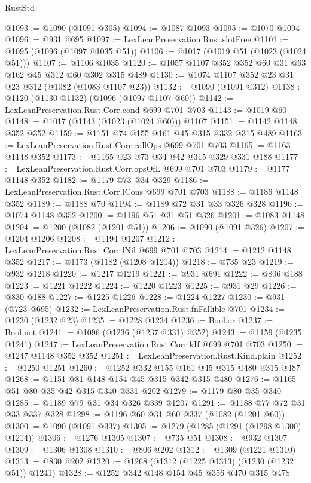 \begin{lexlean}{RustStd}
\begin{coremodule}
{\begin{coremodule}
{{{{{{{{{{@1093 := @1090 (@1091 @305)
@1094 := @1087 @1093
@1095 := @1070 @1094
@1096 := @931 @695
@1097 := LexLeanPreservation.Rust.slotFree
@1101 := @1095 (@1096 (@1097 @1035 @51))
@1106 := @1017 (@1019 @51 (@1023 (@1024 @51)))
@1107 := @1106 @1035
@1120 := @1057 @1107 @352 @352 @60 @31 @63 @162 @45 @312 @60 @302 @315 @489
@1130 := @1074 @1107 @352 @23 @31 @23 @312 (@1082 (@1083 @1107 @23))
@1132 := @1090 (@1091 @312)
@1138 := @1120 (@1130 @1132) (@1096 (@1097 @1107 @60))
@1142 := LexLeanPreservation.Rust.Corr.cond @699 @701 @703
@1143 := @1019 @60
@1148 := @1017 (@1143 (@1023 (@1024 @60))) @1107
@1151 := @1142 @1148 @352 @352
@1159 := @1151 @74 @155 @161 @45 @315 @332 @315 @489
@1163 := LexLeanPreservation.Rust.Corr.callOps @699 @701 @703
@1165 := @1163 @1148 @352
@1173 := @1165 @23 @73 @34 @42 @315 @329 @331 @188
@1177 := LexLeanPreservation.Rust.Corr.opsOfL @699 @701 @703
@1179 := @1177 @1148 @352
@1182 := @1179 @73 @34 @329
@1186 := LexLeanPreservation.Rust.Corr.lCons @699 @701 @703
@1188 := @1186 @1148 @352
@1189 := @1188 @70
@1194 := @1189 @72 @31 @33 @326 @328
@1196 := @1074 @1148 @352
@1200 := @1196 @51 @31 @51 @326
@1201 := @1083 @1148
@1204 := @1200 (@1082 (@1201 @51))
@1206 := @1090 (@1091 @326)
@1207 := @1204 @1206
@1208 := @1194 @1207
@1212 := LexLeanPreservation.Rust.Corr.lNil @699 @701 @703
@1214 := @1212 @1148 @352
@1217 := @1173 (@1182 (@1208 @1214))
@1218 := @735 @23
@1219 := @932 @1218
@1220 := @1217 @1219
@1221 := @931 @691
@1222 := @806 @188
@1223 := @1221 @1222
@1224 := @1220 @1223
@1225 := @931 @29
@1226 := @830 @188
@1227 := @1225 @1226
@1228 := @1224 @1227
@1230 := @931 (@723 @695)
@1232 := LexLeanPreservation.Rust.fnFallible @701
@1234 := @1230 (@1232 @23)
@1235 := @1228 @1234
@1236 := Bool.or
@1237 := Bool.not
@1241 := @1096 (@1236 (@1237 @331) @352)
@1243 := @1159 (@1235 @1241)
@1247 := LexLeanPreservation.Rust.Corr.kIf @699 @701 @703
@1250 := @1247 @1148 @352 @352
@1251 := LexLeanPreservation.Rust.Kind.plain
@1252 := @1250 @1251
@1260 := @1252 @332 @155 @161 @45 @315 @480 @315 @487
@1268 := @1151 @81 @148 @154 @45 @315 @342 @315 @480
@1276 := @1165 @51 @80 @35 @42 @315 @340 @331 @202
@1279 := @1179 @80 @35 @340
@1285 := @1189 @79 @31 @34 @326 @339 @1207
@1291 := @1188 @77 @72 @31 @33 @337 @328
@1298 := @1196 @60 @31 @60 @337 (@1082 (@1201 @60))
@1300 := @1090 (@1091 @337)
@1305 := @1279 (@1285 (@1291 (@1298 @1300) @1214))
@1306 := @1276 @1305
@1307 := @735 @51
@1308 := @932 @1307
@1309 := @1306 @1308
@1310 := @806 @202
@1312 := @1309 (@1221 @1310)
@1313 := @830 @202
@1320 := @1268 (@1312 (@1225 @1313) (@1230 (@1232 @51)) @1241)
@1328 := @1252 @342 @148 @154 @45 @356 @470 @315 @478
}}}}}}}}}}
\end{coremodule}}
\end{coremodule}
\end{lexlean}
